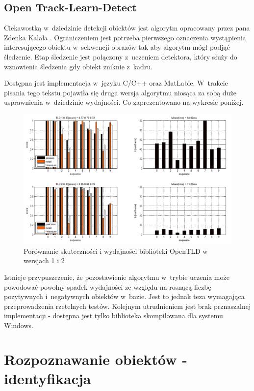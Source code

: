 \subsection{Open Track-Learn-Detect}

Ciekawostką w~dziedzinie detekcji obiektów jest algorytm opracowany przez
pana Zdenka Kalala \cite{DBLP:journals/pami/KalalMM12}.
Ograniczeniem jest potrzeba pierwszego oznaczenia wystąpienia interesującego
obiektu w~sekwencji obrazów tak aby algorytm mógł podjąć śledzenie.
Etap śledzenie jest połączony z~uczeniem detektora, który służy do wznowienia
śledzenia gdy obiekt zniknie z~kadru.

Dostępna jest implementacja w~języku C/C++ oraz MatLabie. W~trakcie
pisania tego tekstu pojawiła się druga wersja algorytmu niosąca
za sobą duże usprawnienia w~dziedzinie wydajności. Co zaprezentowano
na wykresie poniżej.

\begin{figure}[h!]
    \centering
    \includegraphics[width=1\textwidth]{img/rev_open_tld_1_2_comparison}
    \caption{Porównanie skuteczności i wydajności biblioteki OpenTLD w wersjach 1 i 2}
\end{figure}

Istnieje przypuszczenie, że pozostawienie algorytmu w~trybie uczenia
może powodować powolny spadek wydajności ze względu na rosnącą liczbę
pozytywnych i~negatywnych obiektów w~bazie. Jest to jednak teza wymagająca
przeprowadzenia rzetelnych testów. Kolejnym utrudnieniem jest brak
prznaszalnej implementacji - dostępna jest tylko biblioteka skompilowana
dla systemu Windows.

\section{Rozpoznawanie obiektów - identyfikacja}

